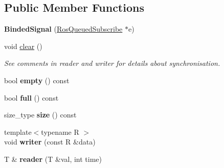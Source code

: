 \subsection*{Public Member Functions}
\begin{DoxyCompactItemize}
\item 
{\bfseries Binded\+Signal} (\hyperlink{classdynamic__graph_1_1RosQueuedSubscribe}{Ros\+Queued\+Subscribe} $\ast$e)\hypertarget{structdynamic__graph_1_1internal_1_1BindedSignal_ae6c7caaafe3050957700695604ec9c08}{}\label{structdynamic__graph_1_1internal_1_1BindedSignal_ae6c7caaafe3050957700695604ec9c08}

\item 
void \hyperlink{structdynamic__graph_1_1internal_1_1BindedSignal_a8d377e90b7ece8b1861ddcfa8c7617c8}{clear} ()\hypertarget{structdynamic__graph_1_1internal_1_1BindedSignal_a8d377e90b7ece8b1861ddcfa8c7617c8}{}\label{structdynamic__graph_1_1internal_1_1BindedSignal_a8d377e90b7ece8b1861ddcfa8c7617c8}

\begin{DoxyCompactList}\small\item\em See comments in reader and writer for details about synchronisation. \end{DoxyCompactList}\item 
bool {\bfseries empty} () const \hypertarget{structdynamic__graph_1_1internal_1_1BindedSignal_a6532521e17e7525a4c243c09bd60012a}{}\label{structdynamic__graph_1_1internal_1_1BindedSignal_a6532521e17e7525a4c243c09bd60012a}

\item 
bool {\bfseries full} () const \hypertarget{structdynamic__graph_1_1internal_1_1BindedSignal_aaeafff3cd27d4d3bc566c3d214020e25}{}\label{structdynamic__graph_1_1internal_1_1BindedSignal_aaeafff3cd27d4d3bc566c3d214020e25}

\item 
size\+\_\+type {\bfseries size} () const \hypertarget{structdynamic__graph_1_1internal_1_1BindedSignal_a55f458e8e74049d37c9a034ce334377d}{}\label{structdynamic__graph_1_1internal_1_1BindedSignal_a55f458e8e74049d37c9a034ce334377d}

\item 
{\footnotesize template$<$typename R $>$ }\\void {\bfseries writer} (const R \&data)\hypertarget{structdynamic__graph_1_1internal_1_1BindedSignal_a31010b861170ae56f87a4457b171a1b9}{}\label{structdynamic__graph_1_1internal_1_1BindedSignal_a31010b861170ae56f87a4457b171a1b9}

\item 
T \& {\bfseries reader} (T \&val, int time)\hypertarget{structdynamic__graph_1_1internal_1_1BindedSignal_a292e656913781f59d244df6cfea7ccb0}{}\label{structdynamic__graph_1_1internal_1_1BindedSignal_a292e656913781f59d244df6cfea7ccb0}

\end{DoxyCompactItemize}

